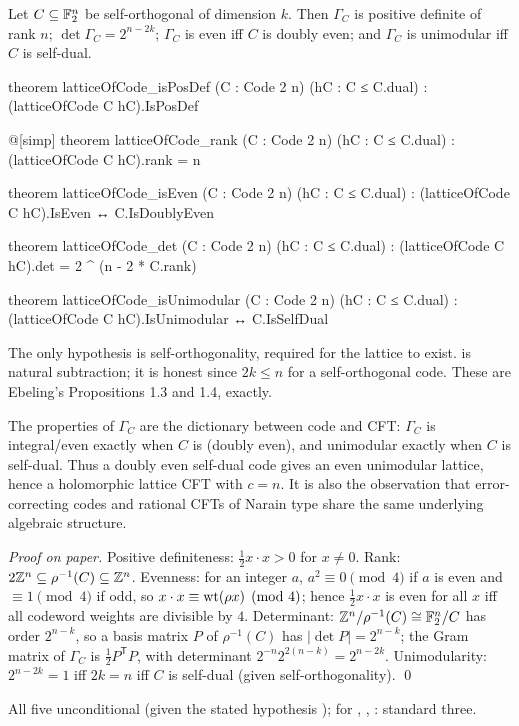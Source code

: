 \begin{theorem}\label{ch02:thm:constructionA}
Let $C\subseteq\mathbb{F}_2^n$ be self-orthogonal of dimension $k$.  Then $\Gamma_C$ is positive
definite of rank $n$; $\det\Gamma_C=2^{n-2k}$; $\Gamma_C$ is even iff $C$ is doubly even; and
$\Gamma_C$ is unimodular iff $C$ is self-dual.
\end{theorem}
\begin{leancode}
theorem latticeOfCode_isPosDef (C : Code 2 n) (hC : C ≤ C.dual) :
    (latticeOfCode C hC).IsPosDef

@[simp] theorem latticeOfCode_rank (C : Code 2 n) (hC : C ≤ C.dual) :
    (latticeOfCode C hC).rank = n

theorem latticeOfCode_isEven (C : Code 2 n) (hC : C ≤ C.dual) :
    (latticeOfCode C hC).IsEven ↔ C.IsDoublyEven

theorem latticeOfCode_det (C : Code 2 n) (hC : C ≤ C.dual) :
    (latticeOfCode C hC).det = 2 ^ (n - 2 * C.rank)

theorem latticeOfCode_isUnimodular (C : Code 2 n) (hC : C ≤ C.dual) :
    (latticeOfCode C hC).IsUnimodular ↔ C.IsSelfDual
\end{leancode}
\begin{dictionary}
The only hypothesis is self-orthogonality, required for the lattice to exist.   is natural subtraction; it is honest since $2k\le n$ for a self-orthogonal code.  These
are Ebeling's Propositions 1.3 and 1.4, exactly.
\end{dictionary}
\begin{physics}
The properties of $\Gamma_C$ are the dictionary between code and CFT: $\Gamma_C$ is integral/even exactly when $C$ is (doubly even), and unimodular exactly when $C$ is self-dual. Thus a doubly even self-dual code gives an even unimodular lattice, hence a holomorphic lattice CFT with $c=n$. It is also the observation that error-correcting codes and rational CFTs of Narain type share the same underlying algebraic structure.
\end{physics}
\emph{Proof on paper.}  Positive definiteness: $\tfrac12x\cdot x>0$ for $x\ne0$.  Rank:
$2{\mathbb{Z}}^n\subseteq\rho^{-1}(C)\subseteq{\mathbb{Z}}^n$.  Evenness: for an integer $a$, $a^2\equiv0\pmod4$ if
$a$ is even and $\equiv1\pmod 4$ if odd, so $x\cdot x\equiv\operatorname{wt}(\rho x)\pmod4$; hence
$\tfrac12x\cdot x$ is even for all $x$ iff all codeword weights are divisible by $4$.
Determinant: ${\mathbb{Z}}^n/\rho^{-1}(C)\cong\mathbb{F}_2^n/C$ has order $2^{n-k}$, so a basis matrix $P$ of
$\rho^{-1}(C)$ has $|\det P|=2^{n-k}$; the Gram matrix of $\Gamma_C$ is $\tfrac12P^{\mathsf T}P$,
with determinant $2^{-n}2^{2(n-k)}=2^{n-2k}$.  Unimodularity: $2^{n-2k}=1$ iff $2k=n$ iff $C$ is
self-dual (given self-orthogonality).  \qed
\begin{status}
All five unconditional (given the stated hypothesis );  for
, , :
standard three.
\end{status}

